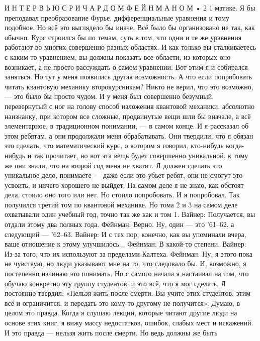 \documentclass[11pt,oneside]{article}
\begin{document}
И Н Т Е Р В Ь Ю  С  Р И Ч А Р Д О М  Ф Е Й Н М А Н О М • 2 1 матике. Я бы преподавал преобразование Фурье, дифференциальные уравнения и тому подобное. Но всё это выглядело бы иначе. Всё было бы организовано не так, как обычно. Курс строился бы по темам, суть в том, что одни и те же уравнения работают во многих совершенно разных областях. И как только вы сталкиваетесь с каким-то уравнением, вы должны показать все области, из которых оно возникает, а не просто рассуждать о самом уравнении. Вот этим я и собирался заняться. Но тут у меня появилась другая возможность. А что если попробовать читать квантовую механику второкурсникам? Никто не верил, что это возможно, --- это было бы просто чудом. И у меня был совершенно безумный, перевернутый с ног на голову способ изложения квантовой механики, абсолютно наизнанку, при котором все сложные, продвинутые вещи шли бы вначале, а всё элементарное, в традиционном понимании, --- в самом конце. И я рассказал об этом ребятам, а они продолжали меня обрабатывать. Они твердили, что я обязан это сделать, что математический курс, о котором я говорил, кто-нибудь когда-нибудь и так прочитает, но вот эта вещь будет совершенно уникальной, к тому же они знали, что на второй год меня не хватит. Я должен сделать это уникальное дело, понимаете --- даже если это убьет ребят, они не смогут это усвоить, и ничего хорошего не выйдет. На самом деле я не знаю, как обстоят дела, стоило оно того или нет. Но стоило попробовать. И я попробовал. Так получился третий том по квантовой механике. Но тома 2 и 3 на самом деле охватывали один учебный год, точно так же как и том 1. Вайнер: Получается, вы отдали этому два полных года. Фейнман: Верно. Ну, один --- это '61–62, а следующий --- '62–63. Вайнер: И с тех пор, конечно, как вы упоминали вчера, ваше отношение к этому улучшилось... Фейнман: В какой-то степени. Вайнер: Из-за того, что их используют за пределами Калтеха. Фейнман: Ну, я этого пока не чувствую, но люди указывают мне на то, что следовало бы. И, возможно, я постепенно начинаю это понимать. Но с самого начала я настаивал на том, что обучаю конкретно эту группу студентов, и это всё, что я мог сделать. Я постоянно твердил: «Нельзя жить после смерти. Вы учите этих студентов, этим всё и ограничится, и передать это кому-то другому не получится». Думаю, в целом это правда. Когда я слушаю лекции, которые читают другие люди на основе этих книг, я вижу массу недостатков, ошибок, слабых мест и искажений. И это правда --- нельзя жить после смерти. Но ведь должны же быть\par
\end{document}
